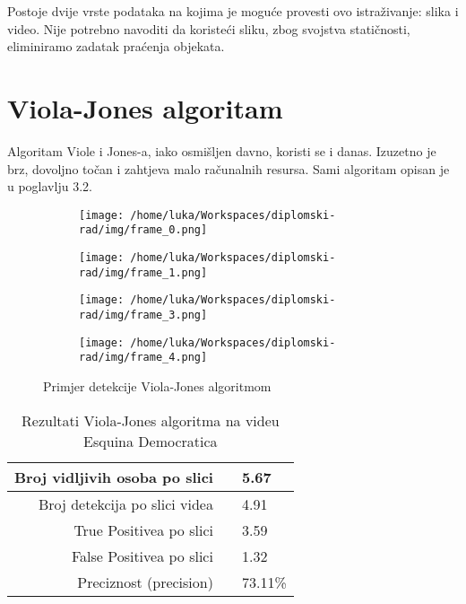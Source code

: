 Postoje dvije vrste podataka na kojima je moguće provesti ovo istraživanje: slika i video. Nije potrebno navoditi da koristeći sliku, zbog svojstva statičnosti, eliminiramo zadatak praćenja objekata.

\section{Viola-Jones algoritam}

Algoritam Viole i Jones-a, iako osmišljen davno, koristi se i danas. Izuzetno je brz, dovoljno točan i zahtjeva malo računalnih resursa. Sami algoritam opisan je u poglavlju 3.2. 

\begin{figure}[htp]
	\centering
	\begin{subfigure}[b]{0.4\linewidth}
		\texttt{[image: /home/luka/Workspaces/diplomski-rad/img/frame\_0.png]}
	\end{subfigure}
	\begin{subfigure}[b]{0.4\linewidth}
		\texttt{[image: /home/luka/Workspaces/diplomski-rad/img/frame\_1.png]}
	\end{subfigure}
	\begin{subfigure}[b]{0.4\linewidth}
		\texttt{[image: /home/luka/Workspaces/diplomski-rad/img/frame\_3.png]}
	\end{subfigure}
	\begin{subfigure}[b]{0.4\linewidth}
		\texttt{[image: /home/luka/Workspaces/diplomski-rad/img/frame\_4.png]}
	\end{subfigure}
	\caption{Primjer detekcije Viola-Jones algoritmom}
	\label{img:violaJones-detection}
\end{figure}

\begin{table}[h]
\centering
\begin{tabular}{|rcl|}
\hline
	Broj vidljivih osoba po slici & & 5.67\\
\hline
	Broj detekcija po slici videa & & 4.91\\
\hline
	True Positivea po slici & & 3.59\\
\hline
	False Positivea po slici & & 1.32\\
\hline
	Preciznost (precision) & & 73.11\%\\
\hline
\end{tabular}
\caption{Rezultati Viola-Jones algoritma na videu Esquina Democratica}
\label{tab:viola-jones-result}
\end{table}

